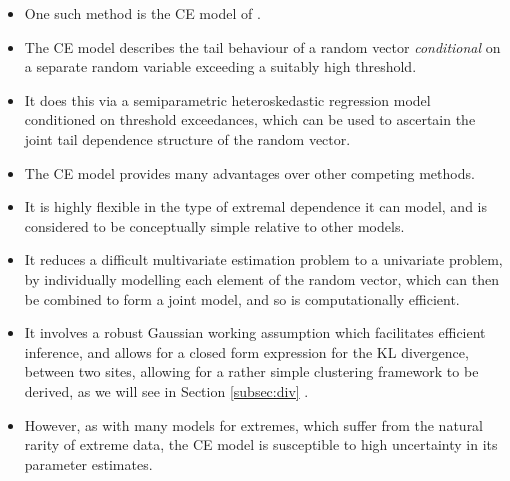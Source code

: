 \documentclass{article}
\numberwithin{equation}{section}
\begin{document}
\begin{itemize}
  \item One such method is the CE model of \citep{Heffernan2004}.
  \item The CE model describes the tail behaviour of a random vector \emph{conditional} on a separate random variable exceeding a suitably high threshold.
  \item It does this via a semiparametric heteroskedastic regression model conditioned on threshold exceedances, which can be used to ascertain the joint tail dependence structure of the random vector.
  \item The CE model provides many advantages over other competing methods. 
  \item It is highly flexible in the type of extremal dependence it can model, and is considered to be conceptually simple relative to other models.
  \item It reduces a difficult multivariate estimation problem to a univariate problem, by individually modelling each element of the random vector, which can then be combined to form a joint model, and so is computationally efficient.
  \item It involves a robust Gaussian working assumption which facilitates efficient inference, and allows for a closed form expression for the KL divergence, between two sites, allowing for a rather simple clustering framework to be derived, as we will see in Section \ref{subsec:div} \citep{Kullback1951}.
  \item However, as with many models for extremes, which suffer from the natural rarity of extreme data, the CE model is susceptible to high uncertainty in its parameter estimates. 
\end{itemize}

\vspace{1cm}
\end{document}
